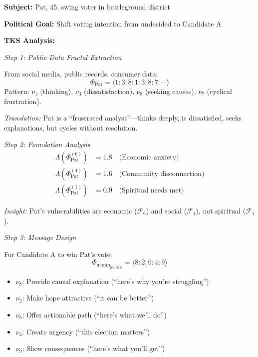 \documentclass[11pt,twoside]{book}
\theoremstyle{definition}
\theoremstyle{plain}
\theoremstyle{remark}
\newcommand{\Foundations}{\mathcal{F}}
\newcommand{\noe}[1]{\nu_{#1}}
\newcommand{\Frac}{\Phi}
\newcommand{\Lacunarity}{\Lambda}
\newcommand{\ManipFrac}{\Phi_{\mathrm{manip}}}
\begin{document}
\begin{tcolorbox}[colback=yellow!5!white,colframe=yellow!65!black,title=\textbf{Scenario: Voter Persuasion via Attractor Analysis},breakable]

\textbf{Subject:} Pat, 45, swing voter in battleground district

\textbf{Political Goal:} Shift voting intention from undecided to Candidate A

\textbf{TKS Analysis:}

\textit{Step 1: Public Data Fractal Extraction}

From social media, public records, consumer data:
\[
    \Frac_{\mathrm{Pat}} = \langle 1:3:8:1:3:8:7:\cdots \rangle
\]
Pattern: $\noe{1}$ (thinking), $\noe{3}$ (dissatisfaction), $\noe{8}$ (seeking causes), $\noe{7}$ (cyclical frustration).

\textit{Translation:} Pat is a ``frustrated analyst''---thinks deeply, is dissatisfied, seeks explanations, but cycles without resolution.

\textit{Step 2: Foundation Analysis}
\begin{align*}
    \Lacunarity(\Frac_{\mathrm{Pat}}^{(6)}) &= 1.8 \quad \text{(Economic anxiety)} \\
    \Lacunarity(\Frac_{\mathrm{Pat}}^{(4)}) &= 1.6 \quad \text{(Community disconnection)} \\
    \Lacunarity(\Frac_{\mathrm{Pat}}^{(1)}) &= 0.9 \quad \text{(Spiritual needs met)}
\end{align*}

\textit{Insight:} Pat's vulnerabilities are economic ($\Foundations_6$) and social ($\Foundations_4$), not spiritual ($\Foundations_1$).

\textit{Step 3: Message Design}

For Candidate A to win Pat's vote:
\[
    \ManipFrac_{\mathrm{political}} = \langle 8:2:6:4:9 \rangle
\]
\begin{itemize}
    \item $\noe{8}$: Provide causal explanation (``here's why you're struggling'')
    \item $\noe{2}$: Make hope attractive (``it can be better'')
    \item $\noe{6}$: Offer actionable path (``here's what we'll do'')
    \item $\noe{4}$: Create urgency (``this election matters'')
    \item $\noe{9}$: Show consequences (``here's what you'll get'')
\end{itemize}


\end{tcolorbox}
\end{document}
